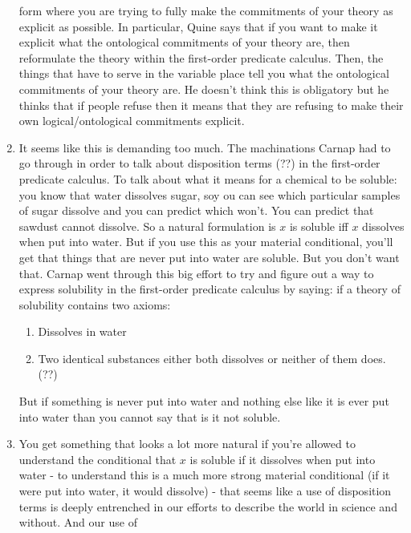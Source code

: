 \documentclass[12pt]{article}
\theoremstyle{definition}
\begin{document}
\begin{enumerate}
        form where you are trying to fully make the commitments of your theory
        as explicit as possible. In particular, Quine says that if you want to
        make it explicit what the ontological commitments of your theory are,
        then reformulate the theory within the first-order predicate calculus.
        Then, the things that have to serve in the variable place tell you what
        the ontological commitments of your theory are. He doesn't think this
        is obligatory but he thinks that if people refuse then it means that
        they are refusing to make their own logical/ontological commitments
        explicit.
    \item
        It seems like this is demanding too much. The machinations Carnap had
        to go through in order to talk about disposition terms (??) in the
        first-order predicate calculus. To talk about what it means for a
        chemical to be soluble: you know that water dissolves sugar, soy ou can
        see which particular samples of sugar dissolve and you can predict
        which won't. You can predict that sawdust cannot dissolve. So a natural
        formulation is $x$ is soluble iff $x$ dissolves when put into water.
        But if you use this as your material conditional, you'll get that
        things that are never put into water are soluble. But you don't want
        that. Carnap went through this big effort to try and figure out a way
        to express solubility in the first-order predicate calculus by saying:
        if a theory of solubility contains two axioms:
        \begin{enumerate}
            \item Dissolves in water
            \item Two identical substances either both dissolves or neither of
                them does. (??)
        \end{enumerate}
        But if something is never put into water and nothing else like it is
        ever put into water than you cannot say that is it not soluble.
    \item
        You get something that looks a lot more natural if you're allowed to
        understand the conditional that $x$ is soluble if it dissolves when put
        into water - to understand this is a much more strong material
        conditional (if it were put into water, it would dissolve) - that seems
        like a use of disposition terms is deeply entrenched in our efforts to
        describe the world in science and without. And our use of

\end{enumerate}
\end{document}

